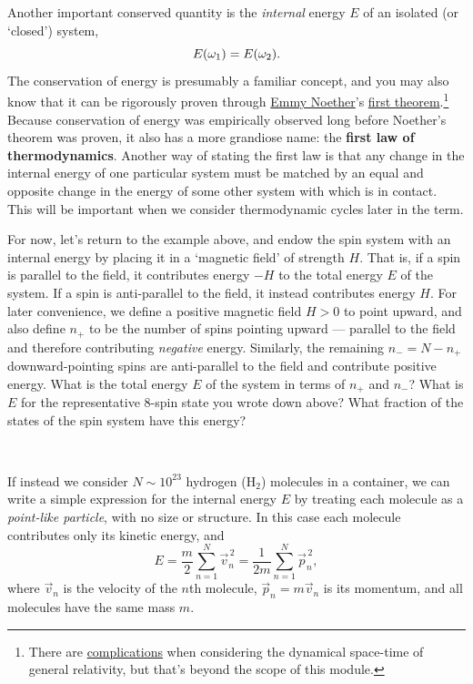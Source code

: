Another important conserved quantity is the \textit{internal} energy $E$ of an isolated (or `closed') system,
\begin{equation*}
  E(\omega_1) = E(\omega_2).
\end{equation*}
The conservation of energy is presumably a familiar concept, and you may also know that it can be rigorously proven through \href{https://en.wikipedia.org/wiki/Emmy_Noether}{Emmy Noether}'s \href{https://en.wikipedia.org/wiki/Noether's_theorem}{first theorem}.\footnote{There are \href{https://www.preposterousuniverse.com/blog/2010/02/22/energy-is-not-conserved/}{complications} when considering the dynamical space-time of general relativity, but that's beyond the scope of this module.}
Because conservation of energy was empirically observed long before Noether's theorem was proven, it also has a more grandiose name: the \textbf{first law of thermodynamics}.
Another way of stating the first law is that any change in the internal energy of one particular system \Om must be matched by an equal and opposite change in the energy of some other system with which \Om is in contact.
This will be important when we consider thermodynamic cycles later in the term.

For now, let's return to the example above, and endow the spin system with an internal energy by placing it in a `magnetic field' of strength $H$.
That is, if a spin is parallel to the field, it contributes energy $-H$ to the total energy $E$ of the system. %
If a spin is anti-parallel to the field, it instead contributes energy $H$.
For later convenience, we define a positive magnetic field $H > 0$ to point upward, and also define $n_+$ to be the number of spins pointing upward --- parallel to the field and therefore contributing \textit{negative} energy.
Similarly, the remaining $n_- = N - n_+$ downward-pointing spins are anti-parallel to the field and contribute positive energy.
What is the total energy $E$ of the system in terms of $n_+$ and $n_-$?
What is $E$ for the representative $8$-spin state you wrote down above?
What fraction of the states of the spin system have this energy?
\begin{mdframed}
  \ \\[100 pt]
\end{mdframed}

If instead we consider $N \sim 10^{23}$ hydrogen (H$_2$) molecules in a container, we can write a simple expression for the internal energy $E$ by treating each molecule as a \textit{point-like particle}, with no size or structure.
In this case each molecule contributes only its kinetic energy, and
\begin{equation*}
  E = \frac{m}{2} \sum_{n = 1}^N \vec{v}_n^{\,2} = \frac{1}{2m} \sum_{n = 1}^N \vec{p}_n^{\,2},
\end{equation*}
where $\vec v_n$ is the velocity of the $n$th molecule, $\vec p_n = m \vec v_n$ is its momentum, and all molecules have the same mass $m$.

